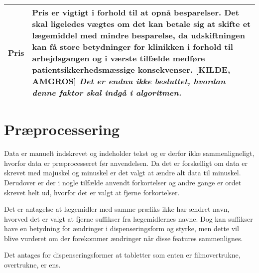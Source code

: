 \begin{table}[H]
\begin{tabular}{p{3.5cm} | p{11cm}}
\textbf{Pris} & \vspace{0.1mm} Pris er vigtigt i forhold til at opnå besparelser. Det skal ligeledes vægtes om det kan betale sig at skifte et lægemiddel med mindre besparelse, da udskiftningen kan få store betydninger for klinikken i forhold til arbejdsgangen og i værste tilfælde medføre patientsikkerhedsmæssige konsekvenser. [KILDE, AMGROS] \textit{Det er endnu ikke besluttet, hvordan denne faktor skal indgå i algoritmen.} \\ \hline
\end{tabular}
\end{table}



\section{Præprocessering}
Data er manuelt indskrevet og indeholder tekst og er derfor ikke sammenligneligt, hvorfor data er præprocesseret før anvendelsen. Da det er forskelligt om data er skrevet med majuskel og minuskel er det valgt at ændre alt data til minuskel. Derudover er der i nogle tilfælde anvendt forkortelser og andre gange er ordet skrevet helt ud, hvorfor det er valgt at fjerne forkortelser. 

Det er antagelse at lægemidler med samme præfiks ikke har ændret navn, hvorved det er valgt at fjerne suffikser fra lægemidlernes navne. Dog kan suffikser have en betydning for ændringer i dispenseringsform og styrke, men dette vil blive vurderet om der forekommer ændringer når disse features sammenlignes.

Det antages for dispenseringsformer at tabletter som enten er filmovertrukne, overtrukne, er ens.








